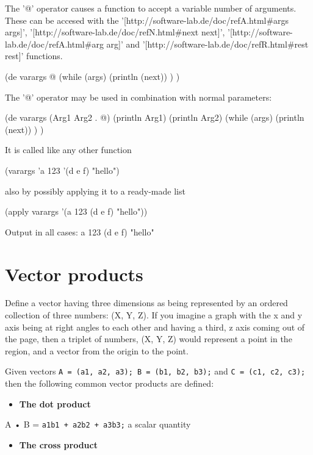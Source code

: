\begin{wideverbatim}

The '@' operator causes a function to accept a variable number of arguments.
These can be accesed with the
'[http://software-lab.de/doc/refA.html#args args]',
'[http://software-lab.de/doc/refN.html#next next]',
'[http://software-lab.de/doc/refA.html#arg arg]' and
'[http://software-lab.de/doc/refR.html#rest rest]' functions.

(de varargs @
   (while (args)
      (println (next)) ) )

The '@' operator may be used in combination with normal parameters:

(de varargs (Arg1 Arg2 . @)
   (println Arg1)
   (println Arg2)
   (while (args)
      (println (next)) ) )

It is called like any other function

(varargs 'a 123 '(d e f) "hello")

also by possibly applying it to a ready-made list

(apply varargs '(a 123 (d e f) "hello"))

Output in all cases:
a
123
(d e f)
"hello"

\end{wideverbatim}

\pagebreak{}
\section*{Vector products}

Define a vector having three dimensions as being represented by an
ordered collection of three numbers: (X, Y, Z). If you imagine a graph
with the x and y axis being at right angles to each other and having a
third, z axis coming out of the page, then a triplet of numbers, (X, Y,
Z) would represent a point in the region, and a vector from the origin
to the point.

Given vectors \texttt{A = (a1, a2, a3); B = (b1, b2, b3);} and
\texttt{C = (c1, c2, c3);} then the following common vector products are
defined:

\begin{itemize}
\item
  \textbf{The dot product}
\end{itemize}

A • B = \texttt{a1b1 + a2b2 + a3b3;} a scalar quantity

\begin{itemize}
\item
  \textbf{The cross product}
\end{itemize}

